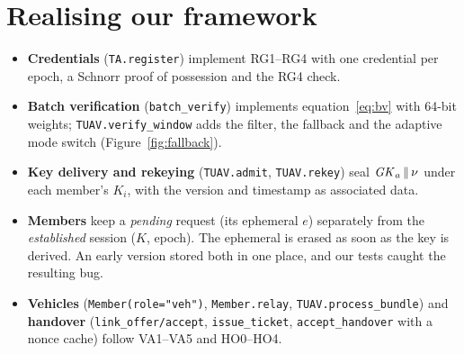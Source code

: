 \section{Realising our framework}
\begin{itemize}
  \item \textbf{Credentials} (\texttt{TA.register}) implement RG1--RG4 with one credential per epoch, a Schnorr proof of possession and the RG4 check.
  \item \textbf{Batch verification} (\texttt{batch\_verify}) implements equation~\eqref{eq:bv} with 64-bit weights; \texttt{TUAV.verify\_window} adds the filter,
        the fallback and the adaptive mode switch (Figure~\ref{fig:fallback}).
  \item \textbf{Key delivery and rekeying} (\texttt{TUAV.admit}, \texttt{TUAV.rekey}) seal $\mathit{GK}_a\,\|\,\nu$ under each member's $K_i$, with the version and timestamp as
        associated data.
  \item \textbf{Members} keep a \emph{pending} request (its ephemeral $e$) separately from the \emph{established} session ($K$, epoch). The ephemeral is erased as
        soon as the key is derived. An early version stored both in one place, and our tests caught the resulting bug.
  \item \textbf{Vehicles} (\texttt{Member(role="veh")}, \texttt{Member.relay}, \texttt{TUAV.process\_bundle}) and \textbf{handover}
        (\texttt{link\_offer/accept}, \texttt{issue\_ticket}, \texttt{accept\_handover} with a nonce cache) follow VA1--VA5 and HO0--HO4.
\end{itemize}

